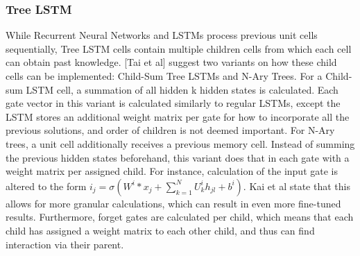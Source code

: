 \subsubsection{Tree LSTM}
While Recurrent Neural Networks and LSTMs process previous unit cells
sequentially, Tree LSTM cells \cite{DBLP:journals/corr/TaiSM15}
\cite{DBLP:journals/corr/ZhuSG15} \cite{DBLP:journals/corr/LeZ15} contain
multiple children cells from which each cell can obtain past knowledge. [Tai et
al] suggest two variants on how these child cells can be implemented: Child-Sum
Tree LSTMs and N-Ary Trees. For a Child-sum LSTM cell, a summation of all hidden
k hidden states is calculated. Each gate vector in this variant is calculated
similarly to regular LSTMs, except the LSTM stores an additional weight matrix
per gate for how to incorporate all the previous solutions, and order of
children is not deemed important. For N-Ary trees, a unit cell additionally
receives a previous memory cell. Instead of summing the previous hidden states
beforehand, this variant does that in each gate with a weight matrix per
assigned child. For instance, calculation of the input gate is altered to the
form $i_j=\sigma(W^i*x_j + \sum\limits_{k=1}^{N}U_k^{i}h_{jl}+b^i)$. Kai et al
state that this allows for more granular calculations, which can result in even
more fine-tuned results. Furthermore, forget gates are calculated per child,
which means that each child has assigned a weight matrix to each other child,
and thus can find interaction via their parent. 